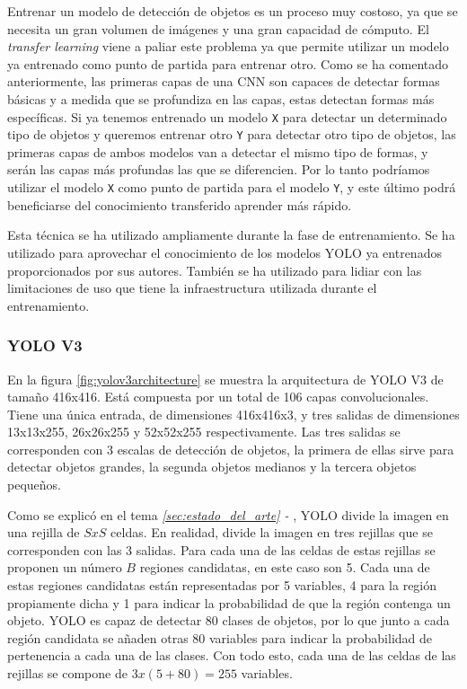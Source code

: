 
Entrenar un modelo de detección de objetos es un proceso muy costoso, ya que se necesita un gran volumen de imágenes y una gran capacidad de cómputo. El \textit{transfer learning} viene a paliar este problema ya que permite utilizar un modelo ya entrenado como punto de partida para entrenar otro. Como se ha comentado anteriormente, las primeras capas de una CNN son capaces de detectar formas básicas y a medida que se profundiza en las capas, estas detectan formas más específicas. Si ya tenemos entrenado un modelo \texttt{X} para detectar un determinado tipo de objetos y queremos entrenar otro \texttt{Y} para detectar otro tipo de objetos, las primeras capas de ambos modelos van a detectar el mismo tipo de formas, y serán las capas más profundas las que se diferencien. Por lo tanto podríamos utilizar el modelo \texttt{X} como punto de partida para el modelo \texttt{Y}, y este último podrá beneficiarse del conocimiento transferido aprender más rápido.

Esta técnica se ha utilizado ampliamente durante la fase de entrenamiento. Se ha utilizado para aprovechar el conocimiento de los modelos YOLO ya entrenados proporcionados por sus autores. También se ha utilizado para lidiar con las limitaciones de uso que tiene la infraestructura utilizada durante el entrenamiento.

\subsubsection*{YOLO V3}

En la figura \ref{fig:yolov3architecture} se muestra la arquitectura de YOLO V3 de tamaño 416x416. Está compuesta por un total de 106 capas convolucionales. Tiene una única entrada, de dimensiones 416x416x3, y tres salidas de dimensiones 13x13x255, 26x26x255 y 52x52x255 respectivamente. Las tres salidas se corresponden con 3 escalas de detección de objetos, la primera de ellas sirve para detectar objetos grandes, la segunda objetos medianos y la tercera objetos pequeños.

Como se explicó en el tema \textit{\ref{sec:estado_del_arte} - }, YOLO divide la imagen en una rejilla de $SxS$ celdas. En realidad, divide la imagen en tres rejillas que se corresponden con las 3 salidas. Para cada una de las celdas de estas rejillas se proponen un número $B$ regiones candidatas, en este caso son 5. Cada una de estas regiones candidatas están representadas por 5 variables, 4 para la región propiamente dicha y 1 para indicar la probabilidad de que la región contenga un objeto. YOLO es capaz de detectar 80 clases de objetos, por lo que junto a cada región candidata se añaden otras 80 variables para indicar la probabilidad de pertenencia a cada una de las clases. Con todo esto, cada una de las celdas de las rejillas se compone de $3 x (5 + 80) = 255$ variables.

